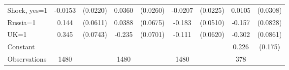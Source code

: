 \begin{tabular}{l|cccccc|cc}
Shock, yes=1    &  -0.0153         & (0.0220)&   0.0360         & (0.0260)&  -0.0207         & (0.0225)&   0.0105         & (0.0308)\\
Russia=1        &    0.144\sym{**} & (0.0611)&   0.0388         & (0.0675)&   -0.183\sym{***}& (0.0510)&   -0.157\sym{*}  & (0.0828)\\
UK=1            &    0.345\sym{***}& (0.0743)&   -0.235\sym{***}& (0.0701)&   -0.111\sym{*}  & (0.0620)&   -0.302\sym{***}& (0.0861)\\
Constant        &                  &         &                  &         &                  &         &    0.226         &  (0.175)\\
\hline
Observations    &     1480         &         &     1480         &         &     1480         &         &      378         &         \\


\end{tabular}
